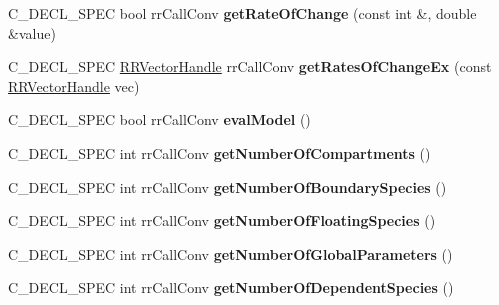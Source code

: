 \begin{DoxyCompactItemize}
\item 
\hypertarget{group__loadsave_gaad38321993112e230f7fccd96345de6c}{
\-C\-\_\-\-D\-E\-C\-L\-\_\-\-S\-P\-E\-C bool rr\-Call\-Conv {\bfseries get\-Rate\-Of\-Change} (const int \&, double \&value)}
\label{group__loadsave_gaad38321993112e230f7fccd96345de6c}

\item 
\hypertarget{group__loadsave_gacfae48e32754e7678b8bb003df93ef53}{
\-C\-\_\-\-D\-E\-C\-L\-\_\-\-S\-P\-E\-C \hyperlink{rr__c__types_8h_aea46a16752b0ae2cd95c009030ee630e}{\-R\-R\-Vector\-Handle} \*
rr\-Call\-Conv {\bfseries get\-Rates\-Of\-Change\-Ex} (const \hyperlink{rr__c__types_8h_aea46a16752b0ae2cd95c009030ee630e}{\-R\-R\-Vector\-Handle} vec)}
\label{group__loadsave_gacfae48e32754e7678b8bb003df93ef53}

\item 
\hypertarget{group__loadsave_ga3fbb7c2fab261f25a3871f1caf398ff1}{
\-C\-\_\-\-D\-E\-C\-L\-\_\-\-S\-P\-E\-C bool rr\-Call\-Conv {\bfseries eval\-Model} ()}
\label{group__loadsave_ga3fbb7c2fab261f25a3871f1caf398ff1}

\item 
\hypertarget{group__loadsave_ga5ea2479b882549edd4fb75397ca38f52}{
\-C\-\_\-\-D\-E\-C\-L\-\_\-\-S\-P\-E\-C int rr\-Call\-Conv {\bfseries get\-Number\-Of\-Compartments} ()}
\label{group__loadsave_ga5ea2479b882549edd4fb75397ca38f52}

\item 
\hypertarget{group__loadsave_ga17c851dfb27b9697ff286cc57d4cd10d}{
\-C\-\_\-\-D\-E\-C\-L\-\_\-\-S\-P\-E\-C int rr\-Call\-Conv {\bfseries get\-Number\-Of\-Boundary\-Species} ()}
\label{group__loadsave_ga17c851dfb27b9697ff286cc57d4cd10d}

\item 
\hypertarget{group__loadsave_ga9a96b81c58073caff01ea2c9e0f5e119}{
\-C\-\_\-\-D\-E\-C\-L\-\_\-\-S\-P\-E\-C int rr\-Call\-Conv {\bfseries get\-Number\-Of\-Floating\-Species} ()}
\label{group__loadsave_ga9a96b81c58073caff01ea2c9e0f5e119}

\item 
\hypertarget{group__loadsave_ga2f33a70dfd6c68fb585cf5d1a9c1339c}{
\-C\-\_\-\-D\-E\-C\-L\-\_\-\-S\-P\-E\-C int rr\-Call\-Conv {\bfseries get\-Number\-Of\-Global\-Parameters} ()}
\label{group__loadsave_ga2f33a70dfd6c68fb585cf5d1a9c1339c}

\item 
\hypertarget{group__loadsave_ga7d573d16a02b3bf4361c00065f624e0b}{
\-C\-\_\-\-D\-E\-C\-L\-\_\-\-S\-P\-E\-C int rr\-Call\-Conv {\bfseries get\-Number\-Of\-Dependent\-Species} ()}
\label{group__loadsave_ga7d573d16a02b3bf4361c00065f624e0b}


\end{DoxyCompactItemize}
